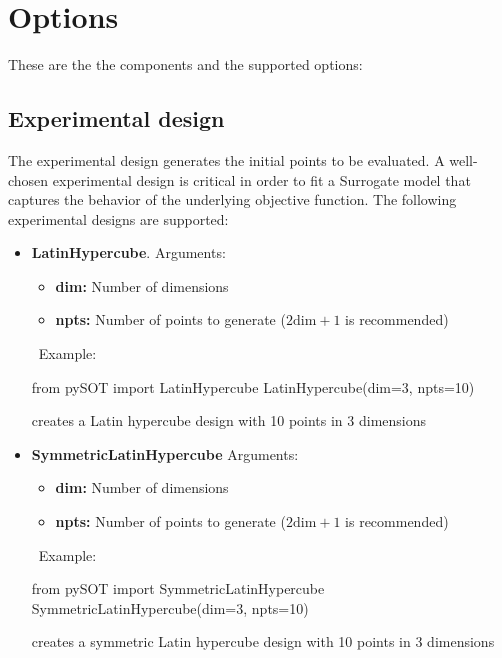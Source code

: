 \documentclass[]{article}
\begin{document}
\section{Options}
These are the the components and the supported options:
\subsection{Experimental design} The experimental design generates the initial points to be evaluated. A well-chosen experimental design is critical in order to fit a Surrogate model that captures the behavior of the underlying objective function. The following experimental designs are supported:
\begin{itemize}
\item \textbf{LatinHypercube}. Arguments:
\begin{itemize}
\item \textbf{dim:} Number of dimensions
\item \textbf{npts:} Number of points to generate ($2 \text{dim}+1$ is recommended)
\end{itemize} 
\ \newline Example: 
\begin{python}
from pySOT import LatinHypercube
LatinHypercube(dim=3, npts=10)
\end{python}
creates a Latin hypercube design with 10 points in 3 dimensions
\item \textbf{SymmetricLatinHypercube} Arguments:
\begin{itemize}
\item \textbf{dim:} Number of dimensions
\item \textbf{npts:} Number of points to generate ($2 \text{dim}+1$ is recommended)
\end{itemize}
\ \newline Example: 
\begin{python}
from pySOT import SymmetricLatinHypercube
SymmetricLatinHypercube(dim=3, npts=10)
\end{python}
creates a symmetric Latin hypercube design with 10 points in 3 dimensions

\end{itemize}
\end{document}
